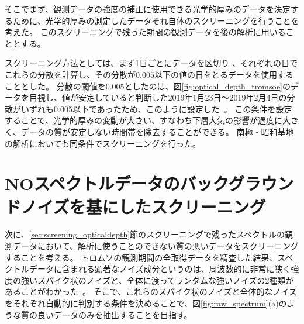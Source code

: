 そこでまず、観測データの強度の補正に使用できる光学的厚みのデータを決定するために、光学的厚みの測定したデータそれ自体のスクリーニングを行うことを考えた。
このスクリーニングで残った期間の観測データを後の解析に用いることとする。\par

スクリーニング方法としては、まず1日ごとにデータを区切り
、それぞれの日でこれらの分散を計算し、その分散が$0.005$以下の値の日をとるデータを使用することとした。
分散の閾値を0.005としたのは、図\ref{fig:optical_depth_tromsoe}のデータを目視し、値が安定していると判断した2019年1月23日〜2019年2月4日の分散がいずれも0.005以下であったため、このように設定した~\cite{goto2021bachelor}。
この条件を設定することで、光学的厚みの変動が大きい、すなわち下層大気の影響が過度に大きく、データの質が安定しない時間帯を除去することができる。
南極・昭和基地の解析においても同条件でスクリーニングを行った。


\section{NOスペクトルデータのバックグラウンドノイズを基にしたスクリーニング}
\label{sec:screening_spectralnoise}
次に、\ref{sec:screening_opticaldepth}節のスクリーニングで残ったスペクトルの観測データにおいて、解析に使うことのできない質の悪いデータをスクリーニングすることを考える。
トロムソの観測期間の全取得データを精査した結果、スペクトルデータに含まれる顕著なノイズ成分というのは、周波数的に非常に狭く強度の強いスパイク状のノイズと、全体に渡ってランダムな強いノイズの2種類があることがわかった~\cite{goto2021bachelor}。
そこで、これらのスパイク状のノイズと全体的なノイズをそれぞれ自動的に判別する条件を決めることで、図\ref{fig:raw_spectrum}(a)のような質の良いデータのみを抽出することを目指す。\par


